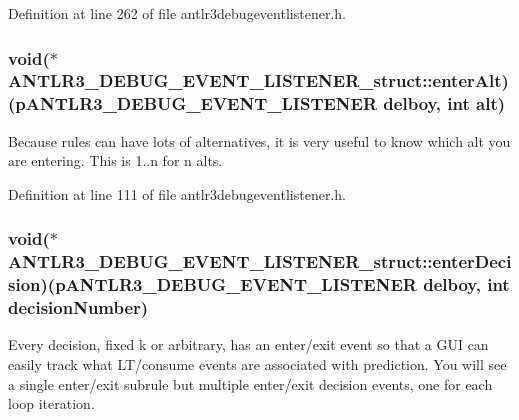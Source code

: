 Definition at line 262 of file antlr3debugeventlistener.\-h.

\hypertarget{struct_a_n_t_l_r3___d_e_b_u_g___e_v_e_n_t___l_i_s_t_e_n_e_r__struct_a7a37a4a27edfab60086ae2c390946322}{
\subsubsection[{enter\-Alt}]{\setlength{\rightskip}{0pt plus 5cm}void($\ast$ A\-N\-T\-L\-R3\-\_\-\-D\-E\-B\-U\-G\-\_\-\-E\-V\-E\-N\-T\-\_\-\-L\-I\-S\-T\-E\-N\-E\-R\-\_\-struct\-::enter\-Alt)({\bf p\-A\-N\-T\-L\-R3\-\_\-\-D\-E\-B\-U\-G\-\_\-\-E\-V\-E\-N\-T\-\_\-\-L\-I\-S\-T\-E\-N\-E\-R} delboy, int alt)}}\label{struct_a_n_t_l_r3___d_e_b_u_g___e_v_e_n_t___l_i_s_t_e_n_e_r__struct_a7a37a4a27edfab60086ae2c390946322}
Because rules can have lots of alternatives, it is very useful to know which alt you are entering. This is 1..n for n alts. 

Definition at line 111 of file antlr3debugeventlistener.\-h.

\hypertarget{struct_a_n_t_l_r3___d_e_b_u_g___e_v_e_n_t___l_i_s_t_e_n_e_r__struct_a793a0776b6f77f5aea2dc58c9ddddfba}{
\subsubsection[{enter\-Decision}]{\setlength{\rightskip}{0pt plus 5cm}void($\ast$ A\-N\-T\-L\-R3\-\_\-\-D\-E\-B\-U\-G\-\_\-\-E\-V\-E\-N\-T\-\_\-\-L\-I\-S\-T\-E\-N\-E\-R\-\_\-struct\-::enter\-Decision)({\bf p\-A\-N\-T\-L\-R3\-\_\-\-D\-E\-B\-U\-G\-\_\-\-E\-V\-E\-N\-T\-\_\-\-L\-I\-S\-T\-E\-N\-E\-R} delboy, int decision\-Number)}}\label{struct_a_n_t_l_r3___d_e_b_u_g___e_v_e_n_t___l_i_s_t_e_n_e_r__struct_a793a0776b6f77f5aea2dc58c9ddddfba}
Every decision, fixed k or arbitrary, has an enter/exit event so that a G\-U\-I can easily track what L\-T/consume events are associated with prediction. You will see a single enter/exit subrule but multiple enter/exit decision events, one for each loop iteration. 

